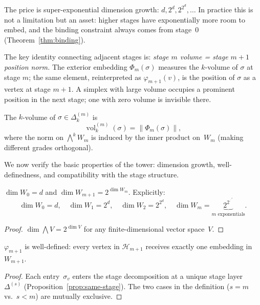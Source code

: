 The price is super-exponential dimension growth: $d, 2^d, 2^{2^d}, \ldots$ In practice this is not a limitation but an asset: higher stages have exponentially more room to embed, and the binding constraint always comes from stage~0 (Theorem~\ref{thm:binding}).

The key identity connecting adjacent stages is: \emph{stage $m$ volume = stage $m+1$ position norm.} The exterior embedding $\Phi_m(\sigma)$ measures the $k$-volume of $\sigma$ at stage $m$; the same element, reinterpreted as $\varphi_{m+1}(v)$, is the position of $\sigma$ as a vertex at stage $m+1$. A simplex with large volume occupies a prominent position in the next stage; one with zero volume is invisible there.

\begin{definition}
The $k$-volume of $\sigma \in \Delta_k^{(m)}$ is
\[
  \operatorname{vol}_k^{(m)}(\sigma) = \|\Phi_m(\sigma)\|,
\]
where the norm on $\bigwedge^k W_m$ is induced by the inner product on~$W_m$ (making different grades orthogonal).
\end{definition}

We now verify the basic properties of the tower: dimension growth, well-definedness, and compatibility with the stage structure.

\begin{proposition}\label{prop:dim-tower}
$\dim W_0 = d$ and $\dim W_{m+1} = 2^{\dim W_m}$. Explicitly:
\[
  \dim W_0 = d, \quad \dim W_1 = 2^d, \quad \dim W_2 = 2^{2^d}, \quad \dim W_m = \underbrace{2^{2^{\cdot^{\cdot^{\cdot^d}}}}}_{m \text{ exponentials}}.
\]
\end{proposition}

\begin{proof}
$\dim \bigwedge V = 2^{\dim V}$ for any finite-dimensional vector space~$V$.
\end{proof}

\begin{proposition}
$\varphi_{m+1}$ is well-defined: every vertex in $\mathcal{H}_{m+1}$ receives exactly one embedding in~$W_{m+1}$.
\end{proposition}

\begin{proof}
Each entry~$\sigma_v$ enters the stage decomposition at a unique stage layer $\Delta^{(s)}$ (Proposition~\ref{prop:same-stage}). The two cases in the definition ($s = m$ vs.\ $s < m$) are mutually exclusive.
\end{proof}

